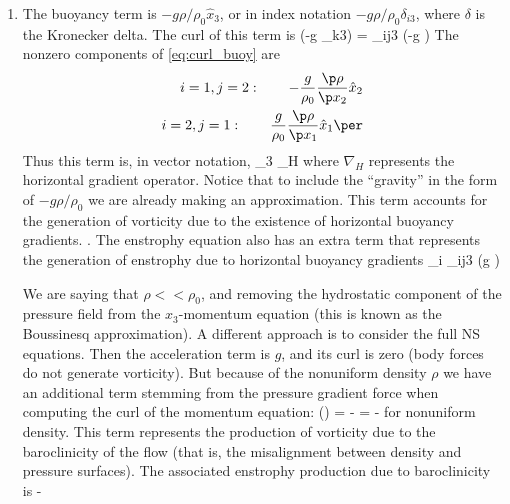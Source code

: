 \documentclass[11pt]{article}
\begin{document}
\begin{enumerate}[label=(\alph*)]
\item The buoyancy term is $-g\rho/\rho_0 \hat{x}_3$, or in index notation $-g\rho/\rho_0 \delta_{i3}$, where $\delta$ is the Kronecker delta. The curl of this term is
    \beq
        \label{eq:curl_buoy}
        \eijk {}\left(-g \delta_{k3}\right) = \varepsilon_{ij3}  \left(-g \right)\per
    \eeq
     The nonzero components of \eqref{eq:curl_buoy} are
     \begin{align}
     i=1,j=2:\qquad -\frac{g}{\rho_0} \frac{\p \rho}{\p x_2} \hat{x}_2\nonumber \\
     i=2,j=1:\qquad  \frac{g}{\rho_0} \frac{\p \rho}{\p x_1}\hat{x}_1\per
    \end{align}
    Thus this term is, in vector notation,
    \beq
         _3 \times \nabla_{H} \rho\com 
    \eeq
    where $\nabla_H$ represents the horizontal gradient operator. Notice that to include the ``gravity'' in the form of $-g \rho/\rho_0 $ we are already making an approximation. This term accounts for the generation of vorticity due to the existence of horizontal buoyancy gradients.
 .  The enstrophy equation also has an extra term that represents the generation of enstrophy due to horizontal buoyancy gradients
     \omega_i \varepsilon_{ij3}  \left(g \right)\per
    \eeq

    We are saying that $\rho << \rho_0$, and removing the hydrostatic component of the pressure field from the $x_3$-momentum equation (this is  known as the Boussinesq approximation). A different approach is to consider the full NS equations. Then the acceleration term is $g$, and its curl is zero (body forces do not generate vorticity). But because of the nonuniform density $\rho$ we have an additional term stemming from the pressure gradient force when computing the curl of the momentum equation:
    \beq
    \nabla \times \left(\right) = - = -\eijk {} 
    \eeq
    for nonuniform density. This term represents the production of vorticity due to the baroclinicity of the flow (that is, the misalignment between density and pressure surfaces). The associated enstrophy production due to baroclinicity is
    \beq
       -\eijk {} \per
    \eeq
     
    \end{enumerate}
\end{document}
